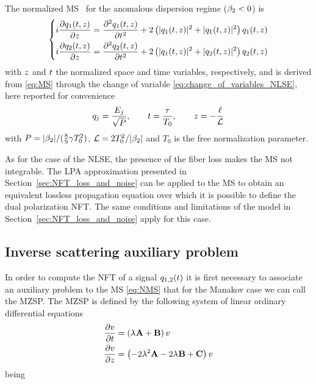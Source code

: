 The normalized \ac{MS}~\cite{Manakov1974a,Ablowitz2004a,Docksey2000a} for the anomalous dispersion  regime ($\dispersion<0$) is
\begin{equation}\label{eq:NMS}
  \left\{\begin{aligned}
    \iunit\pdv{\nfldl[1]}{\nssp}&= \pdv[2]{\nfldl[1]}{t}+2\left(|\nfldl[1]|^2+|\nfldl[1]|^2\right)\nfldl[1]\\
    \iunit\pdv{\nfldl[2]}{\nssp}&= \pdv[2]{\nfldl[2]}{t}+2\left(|\nfldl[1]|^2+|\nfldl[2]|^2\right)\nfldl[2]
  \end{aligned}\right.
\end{equation}
with $\nssp$ and $\nttm$ the normalized space and time variables, respectively, and
is derived from \eqref{eq:MS} through the change of variable \eqref{eq:change_of_variables_NLSE}, here reported for convenience
\begin{equation}\label{eq:normalization}
   \nfld[j] = \dfrac{\fld[j]}{\sqrt{P}}, \hspace{0.7cm} \nttm = \dfrac{\ttm}{T_0}, \hspace{0.7cm} \nssp = -\dfrac{\ssp}{\nftcvL}
\end{equation}
with $P = |\dispersion|/(\frac{8}{9}\nonlinfact T_0^2)$, $\nftcvL = 2 T_0^2 /|\dispersion|$ and $T_0$ is the free normalization parameter.

As for the case of the \ac{NLSE}, the presence of the fiber loss makes the \ac{MS} not integrable. The \ac{LPA} approximation presented in Section~\ref{sec:NFT_loss_and_noise} can be applied to the \ac{MS} to obtain an equivalent lossless propagation equation over which it is possible to define the dual polarization \ac{NFT}. The same conditions and limitations of the model in Section~\ref{sec:NFT_loss_and_noise} apply for this case.


\subsection{Inverse scattering auxiliary problem}
\label{sec:dp_auxiliary_problem}

In order to
compute the \ac{NFT} of a signal $\nfld[1,2](t)$ it is first necessary to associate an auxiliary problem to  the
\ac{MS} \eqref{eq:NMS} that for the Manakov case we can call the \ac{MZSP}. The \ac{MZSP} is defined by the following system of linear ordinary differential equations
\begin{subequations}\label{eq:MZSP}
  \begin{align}
     \pdv{\vecv}{\nttm}&=\left(\eig \mathbf{A}+\mathbf{B}\right)\vecv
     \label{eq:MZSP_time}\\
     \pdv{\vecv}{\nssp}&=\left(-2\eig^2\mathbf{A}-2\eig \mathbf{B}+\mathbf{C}\right)\vecv
     \label{eq:MZSP_space}
  \end{align}
\end{subequations}
being

